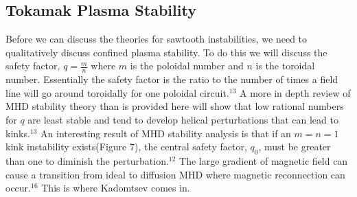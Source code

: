 \documentclass{article}
\begin{document}
\subsection{Tokamak Plasma Stability}
Before we can discuss the theories for sawtooth instabilities, we need to qualitatively discuss confined plasma stability.  To do this we will discuss the safety factor, $q=\frac{m}{n}$ where $m$ is the poloidal number and $n$ is the toroidal number.  Essentially the safety factor is the ratio to the number of times a field line will go around toroidally for one poloidal circuit.$^{13}$  A more in depth review of MHD stability theory than is provided here will show that low rational numbers for $q$ are least stable and tend to develop helical perturbations that can lead to kinks.$^{13}$  An interesting result of MHD stability analysis is that if an $m=n=1$ kink instability exists(Figure 7), the central safety factor, $q_0$, must be greater than one to diminish the perturbation.$^{12}$  The large gradient of magnetic field can cause a transition from ideal to diffusion MHD where magnetic reconnection can occur.$^{16}$  This is where Kadomtsev comes in.
\begin{SCfigure}
\centering
{}
\end{SCfigure}
\end{document}
